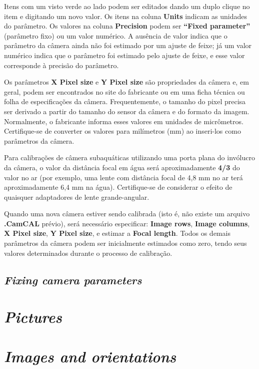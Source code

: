 \documentclass[
  12pt,
  letterpaper,
  DIV=11,
  numbers=noendperiod]{scrreprt}
\begin{document}
Itens com um visto verde ao lado podem ser editados dando um duplo
clique no item e digitando um novo valor. Os itens na coluna
\textbf{Units} indicam as unidades do parâmetro. Os valores na coluna
\textbf{Precision} podem ser \textbf{``Fixed parameter''} (parâmetro
fixo) ou um valor numérico. A ausência de valor indica que o parâmetro
da câmera ainda não foi estimado por um ajuste de feixe; já um valor
numérico indica que o parâmetro foi estimado pelo ajuste de feixe, e
esse valor corresponde à precisão do parâmetro.

Os parâmetros \textbf{X Pixel size} e \textbf{Y Pixel size} são
propriedades da câmera e, em geral, podem ser encontrados no site do
fabricante ou em uma ficha técnica ou folha de especificações da câmera.
Frequentemente, o tamanho do pixel precisa ser derivado a partir do
tamanho do sensor da câmera e do formato da imagem. Normalmente, o
fabricante informa esses valores em unidades de micrômetros.
Certifique-se de converter os valores para milímetros (mm) ao inseri-los
como parâmetros da câmera.

Para calibrações de câmera subaquáticas utilizando uma porta plana do
invólucro da câmera, o valor da distância focal em água será
aproximadamente \textbf{4/3} do valor no ar (por exemplo, uma lente com
distância focal de 4,8 mm no ar terá aproximadamente 6,4 mm na água).
Certifique-se de considerar o efeito de quaisquer adaptadores de lente
grande-angular.

Quando uma nova câmera estiver sendo calibrada (isto é, não existe um
arquivo \textbf{.CamCAL} prévio), será necessário especificar:
\textbf{Image rows}, \textbf{Image columns}, \textbf{X Pixel size},
\textbf{Y Pixel size}, e estimar a \textbf{Focal length}. Todos os
demais parâmetros da câmera podem ser inicialmente estimados como zero,
tendo seus valores determinados durante o processo de calibração.

\subsection{\texorpdfstring{\emph{Fixing camera
parameters}}{Fixing camera parameters}}\label{fixing-camera-parameters-1}

\section{\texorpdfstring{\emph{Pictures}}{Pictures}}\label{pictures-1}

\section{\texorpdfstring{\emph{Images and
orientations}}{Images and orientations}}\label{images-and-orientations-1}
\end{document}
